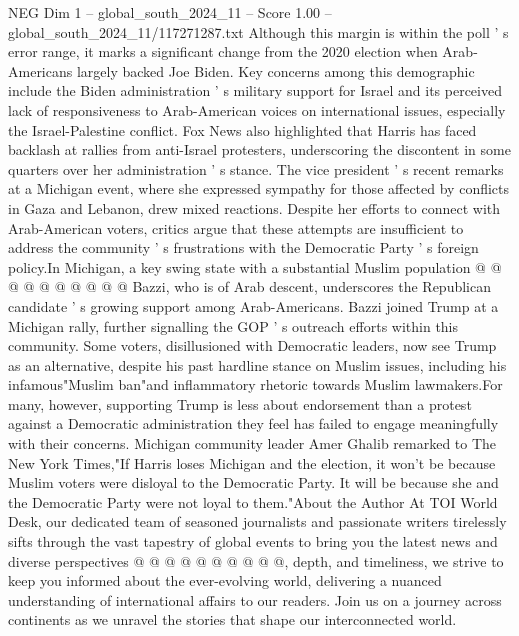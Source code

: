 \begin{textsample}{NEG Dim 1 – global\_south\_2024\_11 – Score 1.00 – global\_south\_2024\_11/117271287.txt}
Although this margin is within the poll ' s error range, it marks a significant change from the 2020 election when Arab-Americans largely backed Joe Biden.
Key concerns among this demographic include the Biden administration ' s military support for Israel and its perceived lack of responsiveness to Arab-American voices on international issues, especially the Israel-Palestine conflict.
Fox News also highlighted that Harris has faced backlash at rallies from anti-Israel protesters, underscoring the discontent in some quarters over her administration ' s stance.
The vice president ' s recent remarks at a Michigan event, where she expressed sympathy for those affected by conflicts in Gaza and Lebanon, drew mixed reactions.
Despite her efforts to connect with Arab-American voters, critics argue that these attempts are insufficient to address the community ' s frustrations with the Democratic Party ' s foreign policy.In Michigan, a key swing state with a substantial Muslim population @ @ @ @ @ @ @ @ @ @ Bazzi, who is of Arab descent, underscores the Republican candidate ' s growing support among Arab-Americans.
Bazzi joined Trump at a Michigan rally, further signalling the GOP ' s outreach efforts within this community.
Some voters, disillusioned with Democratic leaders, now see Trump as an alternative, despite his past hardline stance on Muslim issues, including his infamous"Muslim ban"and inflammatory rhetoric towards Muslim lawmakers.For many, however, supporting Trump is less about endorsement than a protest against a Democratic administration they feel has failed to engage meaningfully with their concerns.
Michigan community leader Amer Ghalib remarked to The New York Times,"If Harris loses Michigan and the election, it won't be because Muslim voters were disloyal to the Democratic Party.
It will be because she and the Democratic Party were not loyal to them."About the Author At TOI World Desk, our dedicated team of seasoned journalists and passionate writers tirelessly sifts through the vast tapestry of global events to bring you the latest news and diverse perspectives @ @ @ @ @ @ @ @ @ @, depth, and timeliness, we strive to keep you informed about the ever-evolving world, delivering a nuanced understanding of international affairs to our readers.
Join us on a journey across continents as we unravel the stories that shape our interconnected world.

\end{textsample}
